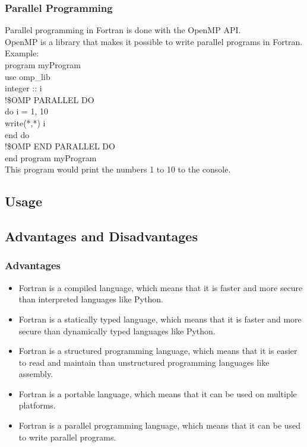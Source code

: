 \documentclass[12pt,a4paper]{scrartcl}
\begin{document}
\subsubsection{Parallel Programming}
Parallel programming in Fortran is done with the OpenMP API.\\
OpenMP is a library that makes it possible to write parallel programs in Fortran.\\
Example:\\
program myProgram\\
use omp\_lib\\
integer :: i\\
!\$OMP PARALLEL DO\\
do i = 1, 10\\
write(*,*) i\\
end do\\
!\$OMP END PARALLEL DO\\
end program myProgram\\
This program would print the numbers 1 to 10 to the console.\\

\subsection{Usage}%


\subsection{Advantages and Disadvantages}
\subsubsection{Advantages}
\begin{itemize}
\item Fortran is a compiled language, which means that it is faster and more secure than interpreted languages like Python.
\item Fortran is a statically typed language, which means that it is faster and more secure than dynamically typed languages like Python.
\item Fortran is a structured programming language, which means that it is easier to read and maintain than unstructured programming languages like assembly.
\item Fortran is a portable language, which means that it can be used on multiple platforms.
\item Fortran is a parallel programming language, which means that it can be used to write parallel programs.
\end{itemize}
\end{document}
